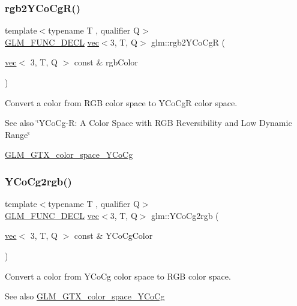 \subsubsection{\texorpdfstring{rgb2\+Y\+Co\+Cg\+R()}{rgb2YCoCgR()}}
{\footnotesize\ttfamily template$<$typename T , qualifier Q$>$ \\
\hyperlink{setup_8hpp_ab2d052de21a70539923e9bcbf6e83a51}{G\+L\+M\+\_\+\+F\+U\+N\+C\+\_\+\+D\+E\+CL} \hyperlink{structglm_1_1vec}{vec}$<$3, T, Q$>$ glm\+::rgb2\+Y\+Co\+CgR (\begin{DoxyParamCaption}\item[{\hyperlink{structglm_1_1vec}{vec}$<$ 3, T, Q $>$ const \&}]{rgb\+Color }\end{DoxyParamCaption})}

Convert a color from R\+GB color space to Y\+Co\+CgR color space. \begin{DoxySeeAlso}{See also}
\char`\"{}\+Y\+Co\+Cg-\/\+R\+: A Color Space with R\+G\+B Reversibility and Low Dynamic Range\char`\"{} 

\hyperlink{group__gtx__color__space___y_co_cg}{G\+L\+M\+\_\+\+G\+T\+X\+\_\+color\+\_\+space\+\_\+\+Y\+Co\+Cg} 
\end{DoxySeeAlso}
\mbox{\label{group__gtx__color__space___y_co_cg_ga163596b804c7241810b2534a99eb1343}} 
\subsubsection{\texorpdfstring{Y\+Co\+Cg2rgb()}{YCoCg2rgb()}}
{\footnotesize\ttfamily template$<$typename T , qualifier Q$>$ \\
\hyperlink{setup_8hpp_ab2d052de21a70539923e9bcbf6e83a51}{G\+L\+M\+\_\+\+F\+U\+N\+C\+\_\+\+D\+E\+CL} \hyperlink{structglm_1_1vec}{vec}$<$3, T, Q$>$ glm\+::\+Y\+Co\+Cg2rgb (\begin{DoxyParamCaption}\item[{\hyperlink{structglm_1_1vec}{vec}$<$ 3, T, Q $>$ const \&}]{Y\+Co\+Cg\+Color }\end{DoxyParamCaption})}

Convert a color from Y\+Co\+Cg color space to R\+GB color space. \begin{DoxySeeAlso}{See also}
\hyperlink{group__gtx__color__space___y_co_cg}{G\+L\+M\+\_\+\+G\+T\+X\+\_\+color\+\_\+space\+\_\+\+Y\+Co\+Cg} 
\end{DoxySeeAlso}
\mbox{\label{group__gtx__color__space___y_co_cg_gaf8d30574c8576838097d8e20c295384a}} 
